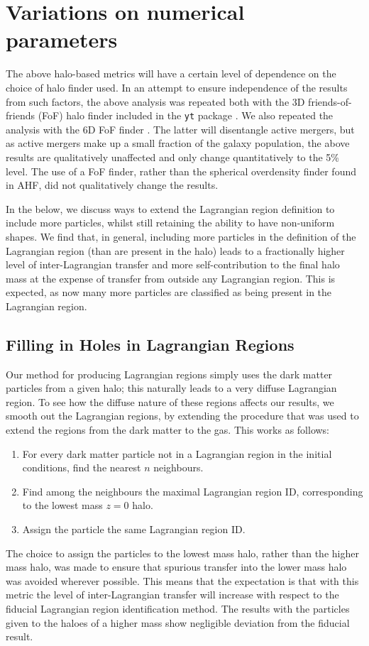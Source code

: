 \section{Variations on numerical parameters}
\label{sec:convergence}

The above halo-based metrics will have a certain level of dependence on the
choice of halo finder used. In an attempt to ensure independence of the
results from such factors, the above analysis was repeated both with the 3D
friends-of-friends (FoF) halo finder included in the {\tt yt} package
\citep{Turk2011}. We also repeated the analysis with the \velociraptor{} 6D
FoF finder \citep{Elahi2019}. The latter will disentangle active mergers, but
as active mergers make up a small fraction of the galaxy population, the
above results are qualitatively unaffected and only change quantitatively
to the 5\% level. The use of a FoF finder, rather than the spherical
overdensity finder found in AHF, did not qualitatively change the results.

In the below, we discuss ways to extend the Lagrangian region definition to include
more particles, whilst still retaining the ability to have non-uniform shapes. We
find that, in general, including more particles in the definition of the Lagrangian
region (than are present in the halo) leads to a fractionally higher level
of inter-Lagrangian transfer and more self-contribution to the final halo mass
at the expense of transfer from outside any Lagrangian region. This is expected, as
now many more particles are classified as being present in the Lagrangian region.


\subsection{Filling in Holes in Lagrangian Regions}

Our method for producing Lagrangian regions simply uses the dark matter
particles from a given halo; this naturally leads to a very diffuse
Lagrangian region. To see how the diffuse nature of these regions affects our
results, we smooth out the Lagrangian regions, by extending the procedure
that was used to extend the regions from the dark matter to the gas. This
works as follows:
\begin{enumerate}
	\item For every dark matter particle not in a Lagrangian region 
	      in the initial conditions, find the nearest $n$ neighbours.
	\item Find among the neighbours the maximal Lagrangian region ID,
	      corresponding to the lowest mass $z=0$ halo.
	\item Assign the particle the same Lagrangian region ID.
\end{enumerate}
The choice to assign the particles to the lowest mass halo, rather than the
higher mass halo, was made to ensure that spurious transfer into the lower mass
halo was avoided wherever possible. This means that the expectation is that
with this metric the level of inter-Lagrangian transfer will increase with
respect to the fiducial Lagrangian region identification method. The results
with the particles given to the haloes of a higher mass show negligible
deviation from the fiducial result.

